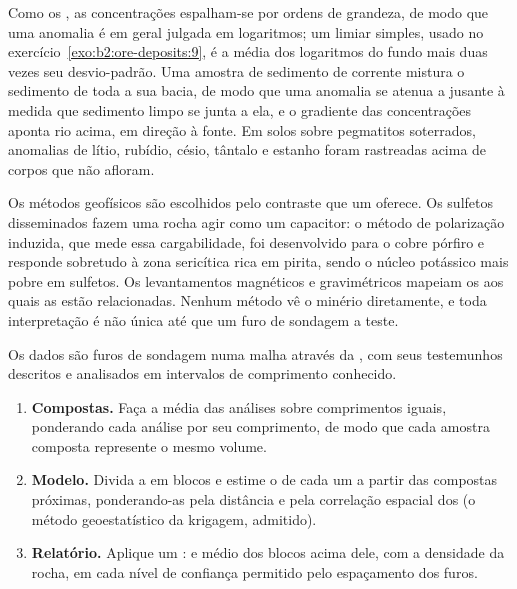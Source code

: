 Como os , as concentrações espalham-se por ordens de grandeza, de modo que uma anomalia é em geral julgada em
logaritmos; um limiar simples, usado no exercício~\ref{exo:b2:ore-deposits:9}, é a média dos
logaritmos do fundo mais duas vezes seu desvio-padrão. Uma amostra de sedimento de corrente
mistura o sedimento de toda a sua bacia, de modo que uma anomalia se atenua a jusante à medida que sedimento limpo se
junta a ela, e o gradiente das concentrações aponta rio acima, em direção à fonte. Em solos sobre
pegmatitos soterrados, anomalias de lítio, rubídio, césio, tântalo e estanho foram rastreadas acima de
corpos que não afloram.

Os métodos geofísicos são escolhidos pelo contraste que um  oferece. Os sulfetos disseminados fazem uma
rocha agir como um capacitor: o método de polarização induzida, que mede essa cargabilidade, foi
desenvolvido para o cobre pórfiro e responde sobretudo à zona sericítica rica em pirita, sendo o núcleo
potássico mais pobre em sulfetos. Os levantamentos magnéticos e gravimétricos mapeiam os  aos quais as 
estão relacionadas. Nenhum método vê o minério
diretamente, e toda interpretação é não única até que um furo de sondagem a teste.

\begin{method}\label{met:b2:ore-deposits:resource}
Os dados são furos de sondagem numa malha através da , com seus testemunhos descritos e analisados em intervalos
de comprimento conhecido.
\begin{enumerate}
  \item \textbf{Compostas.} Faça a média das análises sobre comprimentos iguais, ponderando cada análise por seu
        comprimento, de modo que cada amostra composta represente o mesmo volume.
  \item \textbf{Modelo.} Divida a  em blocos e estime o  de cada um a partir das
        compostas próximas, ponderando-as pela distância e pela correlação espacial dos 
        (o método geoestatístico da krigagem, admitido).
  \item \textbf{Relatório.} Aplique um :  e  médio dos blocos acima dele, com a
        densidade da rocha, em cada nível de confiança permitido pelo espaçamento dos furos.
\end{enumerate}
\end{method}

